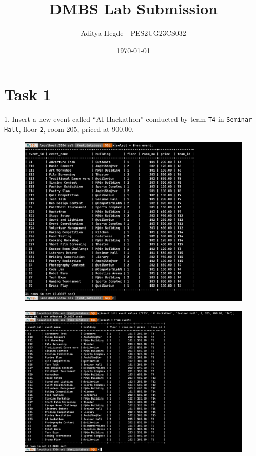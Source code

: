 \documentclass[12pt,a4paper]{article}
\title{DMBS Lab Submission}
\author{Aditya Hegde \@- PES2UG23CS032}
\date{\today}
\begin{document}
\maketitle

\section{Task 1}

1. Insert a new event called ``AI Hackathon'' conducted by team \texttt{T4} in \texttt{Seminar Hall}, floor \texttt{2}, room 205, priced at 900.00.

\begin{figure}[H]
    \centering 
    \includegraphics[width=0.9\linewidth]{./images/task1/1a.png}
\end{figure}

\begin{figure}[H]
    \centering 
    \includegraphics[width=0.9\linewidth]{./images/task1/1b.png}
\end{figure}
\end{document}
